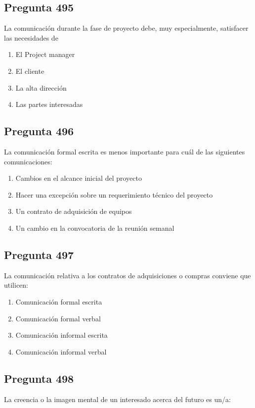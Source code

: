 \documentclass[11pt,a4paper]{article}
\begin{document}
\subsection*{Pregunta 495}
La comunicación durante la fase de proyecto debe, muy especialmente, satisfacer las necesidades de

\begin{enumerate}[label=\alph*)]
  \item El Project manager
  \item El cliente
  \item La alta dirección
  \item Las partes interesadas
\end{enumerate}

\subsection*{Pregunta 496}
La comunicación formal escrita es menos importante para cuál de las siguientes comunicaciones:

\begin{enumerate}[label=\alph*)]
  \item Cambios en el alcance inicial del proyecto
  \item Hacer una excepción sobre un requerimiento técnico del proyecto
  \item Un contrato de adquisición de equipos
  \item Un cambio en la convocatoria de la reunión semanal
\end{enumerate}

\subsection*{Pregunta 497}
La comunicación relativa a los contratos de adquisiciones o compras conviene que utilicen:

\begin{enumerate}[label=\alph*)]
  \item Comunicación formal escrita
  \item Comunicación formal verbal
  \item Comunicación informal escrita
  \item Comunicación informal verbal
\end{enumerate}

\subsection*{Pregunta 498}
La creencia o la imagen mental de un interesado acerca del futuro es un/a:
\end{document}

